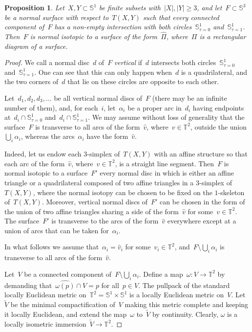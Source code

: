 \documentclass{amsart}
\theoremstyle{theorem}
\newtheorem{prop}[theo]{Proposition}
\theoremstyle{remark}
\theoremstyle{definition}
\numberwithin{equation}{section}
\numberwithin{figure}{section}
\begin{document}
\begin{prop}\label{normal=>rect-prop}
Let~$X,Y\subset\mathbb S^1$ be finite subsets with~$|X|,|Y|\geqslant3$, and let~$F\subset\mathbb S^3$
be a normal surface with respect to~$T(X,Y)$ such that every connected component of~$F$
has a non-empty intersection with both circles~$\mathbb S^1_{\tau=0}$ and~$\mathbb S^1_{\tau=1}$. Then~$F$
is normal isotopic to a surface of the form~$\widehat\Pi$, where~$\Pi$ is a rectangular diagram of a surface.
\end{prop}

\begin{proof}
We call a normal disc~$d$ of~$F$ \emph{vertical} if~$d$ intersects both circles~$\mathbb S^1_{\tau=0}$
and~$\mathbb S^1_{\tau=1}$. One can see that this can only happen when~$d$ is a quadrilateral,
and the two corners of~$d$ that lie on these circles are opposite to each other.

Let~$d_1,d_2,d_3,\ldots$ be all vertical normal discs of~$F$ (there may be an infinite number of them), and, for each~$i$,
let~$\alpha_i$ be a proper arc in~$d_i$ having endpoints at~$d_i\cap\mathbb S^1_{\tau=0}$ and~$d_i\cap\mathbb S^1_{\tau=1}$. We may assume without loss of generality that the surface~$F$
is transverse to all arcs of the form~$\widehat v$, where~$v\in\mathbb T^2$, outside the union~$\bigcup_i\alpha_i$,
whereas the arcs~$\alpha_i$ have the form~$\widehat v$.

Indeed, let us endow each $3$-simplex of~$T(X,Y)$ with an affine structure so that each arc of the form~$\widehat v$,
where~$v\in\mathbb T^2$, is a straight line segment. Then~$F$ is normal isotopic to a surface~$F'$ every
normal disc in which is either an affine triangle or a quadrilateral composed of two affine triangles in a $3$-simplex of~$T(X,Y)$,
where the normal isotopy can be chosen to be fixed on the $1$-skeleton of~$T(X,Y)$.
Moreover, vertical normal discs of~$F'$ can be chosen
in the form of the union of two affine triangles sharing a side of the form~$\widehat v$ for some~$v\in\mathbb T^2$.
The surface~$F'$ is transverse to the arcs of the form~$\widehat v$ everywhere except at a union of arcs
that can be taken for~$\alpha_i$.

In what follows we assume that~$\alpha_i=\widehat v_i$ for some~$v_i\in\mathbb T^2$, and~$F\setminus\bigcup_i\alpha_i$
is transverse to all arcs of the form~$\widehat v$.

Let~$V$ be a connected component of~$F\setminus\bigcup_i\alpha_i$. Define a map~$\omega:V\rightarrow\mathbb T^2$
by demanding that~$\widehat{\omega(p)}\cap V=p$ for all~$p\in V$. The pullpack of the standard locally
Euclidean metric on~$\mathbb T^2=\mathbb S^1\times\mathbb S^1$
is a locally Euclidean metric on~$V$. Let~$\widetilde V$ be the minimal compactification of~$V$
making this metric complete and keeping it locally Euclidean, and extend the map~$\omega$ to~$\widetilde V$ by continuity.
Clearly, $\omega$ is a locally isometric immersion~$\widetilde V\rightarrow\mathbb T^2$.


\end{proof}
\end{document}

